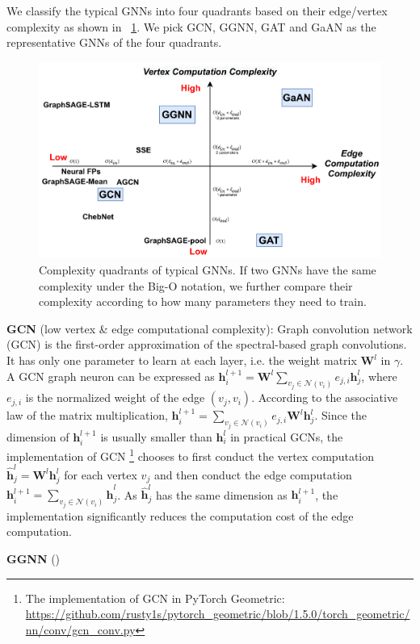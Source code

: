 We classify the typical GNNs into four quadrants based on their edge/vertex complexity as shown in \figurename~\ref{fig:gnn_complexity_quadrant}. We pick GCN, GGNN, GAT and GaAN as the representative GNNs of the four quadrants.

\begin{figure}
	\centering
	\includegraphics[width=0.7\columnwidth]{figs/illustration/GNN_complexity_quadrant.png}
	\caption{Complexity quadrants of typical GNNs. If two GNNs have the same complexity under the Big-O notation, we further compare their complexity according to how many parameters they need to train.}
	\label{fig:gnn_complexity_quadrant}
\end{figure}

\textbf{GCN} \cite{kipf2017_gcn} (low vertex \& edge computational complexity): Graph convolution network (GCN) is the first-order approximation of the spectral-based graph convolutions.
It has only one parameter to learn at each layer, i.e. the weight matrix $\boldsymbol{W}^l$ in $\gamma$.
A GCN graph neuron can be expressed as $\boldsymbol{h}^{l+1}_i = \boldsymbol{W}^l\sum_{v_j \in \mathcal{N}(v_i)}{e_{j,i}\boldsymbol{h}^l_j}$, where $e_{j,i}$ is the normalized weight of the edge $(v_j, v_i)$.
According to the associative law of the matrix multiplication, $\boldsymbol{h}^{l+1}_i = \sum_{v_j \in \mathcal{N}(v_i)}{e_{j,i}\boldsymbol{W}^l\boldsymbol{h}^l_j}$.
Since the dimension of $\boldsymbol{h}^{l+1}_i$ is usually smaller than $\boldsymbol{h}^l_i$ in practical GCNs, the implementation of GCN \footnote{The implementation of GCN in PyTorch Geometric: \url{ https://github.com/rusty1s/pytorch_geometric/blob/1.5.0/torch_geometric/nn/conv/gcn_conv.py}} chooses to first conduct the vertex computation $\hat{\boldsymbol{h}}^l_j = \boldsymbol{W}^l\boldsymbol{h}^l_j$ for each vertex $v_j$ and then conduct the edge computation $\boldsymbol{h}^{l+1}_i=\sum_{v_j\in\mathcal{N}(v_i)}{\hat{\boldsymbol{h}}^l_j}$.
As $\hat{\boldsymbol{h}}^l_j$ has the same dimension as $\boldsymbol{h}^{l+1}_i$, the implementation significantly reduces the  computation cost of the edge computation.

\textbf{GGNN} ()
